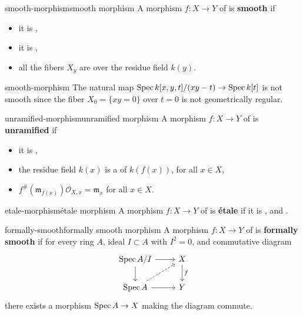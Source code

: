 \begin{topic}{smooth-morphism}{smooth morphism}
    A morphism $f : X \to Y$ of  is \textbf{smooth} if
    \begin{itemize}
        \item it is ,
        \item it is ,
        \item all the fibers $X_y$ are  over the residue field $k(y)$.
    \end{itemize}
\end{topic}

\begin{example}{smooth-morphism}
    The natural map $\operatorname{Spec} k[x, y, t] / (xy - t) \to \operatorname{Spec} k[t]$ is not smooth since the fiber $X_0 = \{ xy = 0 \}$ over $t = 0$ is not geometrically regular.
\end{example}

\begin{topic}{unramified-morphism}{unramified morphism}
    A morphism $f : X \to Y$ of  is \textbf{unramified} if
    \begin{itemize}
        \item it is ,
        \item the residue field $k(x)$ is a  of $k(f(x))$, for all $x \in X$,
        \item $f^\#(\mathfrak{m}_{f(x)}) \mathcal{O}_{X, x} = \mathfrak{m}_x$ for all $x \in X$.
    \end{itemize}
\end{topic}

\begin{topic}{etale-morphism}{étale morphism}
    A morphism $f : X \to Y$ of  is \textbf{étale} if it is ,  and .
\end{topic}

\begin{topic}{formally-smooth}{formally smooth morphism}
    A morphism $f : X \to Y$ of  is \textbf{formally smooth} if for every ring $A$, ideal $I \subset A$ with $I^2 = 0$, and commutative diagram
    \[ \begin{tikzcd} \Spec A/I \arrow{r} \arrow{d} & X \arrow{d}{f} \\ \Spec A \arrow{r} \arrow[dashed]{ur} & Y \end{tikzcd} \]
    there exists a morphism $\operatorname{Spec} A \to X$ making the diagram commute.
\end{topic}

